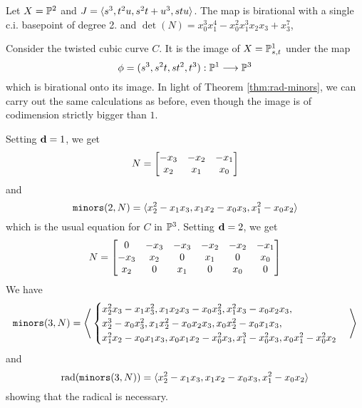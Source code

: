 \documentclass[fleqn,reqno]{amsart}
\numberwithin{first}{chapter}
\begin{document}
\begin{example}[$\mt{ex306}$]
\label{ex306}
Let $X=\mathbb{P}^2$ and $J=\langle s^3,t^2u,s^2t+u^3,stu\rangle$.
The map is birational with a single c.i. basepoint of degree 2.
and $\det(N)={x}_{0}^{3} {x}_{1}^{4}-{x}_{0}^{2} {x}_{1}^{3} {x}_{2} {x}_{3}+{x}_{3}^{7}$,
\end{example}

\begin{example}[$\mt{ex307}$]
\label{ex307}
Consider the twisted cubic curve $C$.
It is the image of $X=\mathbb{P}^1_{s,t}$ under the map
\[
	\phi=(s^3,s^2t,st^2,t^3):\mathbb{P}^1\longrightarrow\mathbb{P}^3
\]
which is birational onto its image.
In light of Theorem \ref{thm:rad-minors}, we can carry out the same calculations
as before, even though the image is of codimension strictly bigger than $1$.

Setting $\mathbf d=1$, we get
\[
	N=
	\bgroup\begin{bmatrix}{-{x}_{3}}&
      {-{x}_{2}}&
      {-{x}_{1}}\\
      {x}_{2}&
      {x}_{1}&
      {x}_{0}\\
      \end{bmatrix}\egroup
\]
and
\[
	\mathop{\tt minors}(2,N)=\langle {x}_{2}^{2}-{x}_{1} {x}_{3},{x}_{1} {x}_{2}-{x}_{0}
      {x}_{3},{x}_{1}^{2}-{x}_{0} {x}_{2}\rangle
\]
which is the usual equation for $C$ in $\mathbb{P}^3$. Setting $\mathbf d=2$, we get
\[
	N=
	\bgroup\begin{bmatrix}0&
      {-{x}_{3}}&
      {-{x}_{3}}&
      {-{x}_{2}}&
      {-{x}_{2}}&
      {-{x}_{1}}\\
      {-{x}_{3}}&
      {x}_{2}&
      0&
      {x}_{1}&
      0&
      {x}_{0}\\
      {x}_{2}&
      0&
      {x}_{1}&
      0&
      {x}_{0}&
      0\\
      \end{bmatrix}\egroup
\]
We have
\[
	\mathop{\tt minors}(3,N)=\Bigg\langle
	\begin{cases}
	{x}_{2}^{2} {x}_{3}-{x}_{1} {x}_{3}^{2},
	{x}_{1} {x}_{2} {x}_{3}-{x}_{0}{x}_{3}^{2},
	{x}_{1}^{2} {x}_{3}-{x}_{0} {x}_{2} {x}_{3},\\
	{x}_{2}^{3}-{x}_{0}{x}_{3}^{2},
	{x}_{1} {x}_{2}^{2}-{x}_{0} {x}_{2} {x}_{3},
	{x}_{0}{x}_{2}^{2}-{x}_{0} {x}_{1} {x}_{3},\\
	{x}_{1}^{2} {x}_{2}-{x}_{0} {x}_{1}{x}_{3},
	{x}_{0} {x}_{1} {x}_{2}-{x}_{0}^{2} {x}_{3},
	{x}_{1}^{3}-{x}_{0}^{2}{x}_{3},{x}_{0} {x}_{1}^{2}-{x}_{0}^{2} {x}_{2}
	\end{cases}
	\Bigg\rangle
\]
and
\[
	\operatorname{rad}(\mathop{\tt minors}(3,N))=
	\langle {x}_{2}^{2}-{x}_{1} {x}_{3},{x}_{1} {x}_{2}-{x}_{0}
	      {x}_{3},{x}_{1}^{2}-{x}_{0} {x}_{2}\rangle
\]
showing that the radical is necessary.
\end{example}
\end{document}
